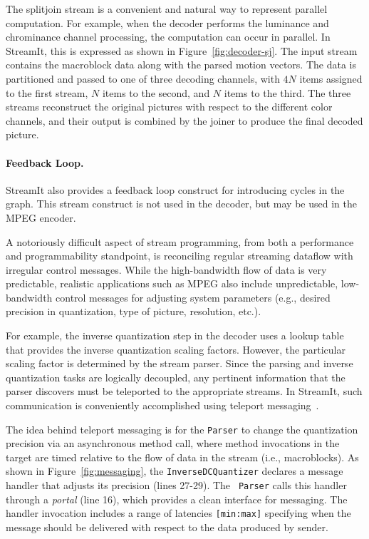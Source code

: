 The splitjoin stream is a convenient and natural way to represent
parallel computation. For example, when the decoder performs the
luminance and chrominance channel processing, the computation can
occur in parallel. In StreamIt, this is expressed as shown in
Figure~\ref{fig:decoder-sj}. The input stream contains the
macroblock data along with the parsed motion vectors. The data is
partitioned and passed to one of three decoding channels, with $4N$
items assigned to the first stream, $N$ items to the second, and $N$
items to the third. The three streams reconstruct the original
pictures with respect to the different color channels, and their
output is combined by the joiner to produce the final decoded picture.

\paragraph{Feedback Loop.}
StreamIt also provides a feedback loop construct for introducing
cycles in the graph. This stream construct is not used in the decoder,
but may be used in the MPEG encoder.

\label{sec:messaging}
A notoriously difficult aspect of stream programming, from both a
performance and programmability standpoint, is reconciling regular
streaming dataflow with irregular control messages.  While the
high-bandwidth flow of data is very predictable, realistic
applications such as MPEG also include unpredictable, low-bandwidth
control messages for adjusting system parameters (e.g., desired
precision in quantization, type of picture, resolution, etc.).

For example, the inverse quantization step in the decoder uses a
lookup table that provides the inverse quantization scaling factors.
However, the particular scaling factor is determined by the stream
parser. Since the parsing and inverse quantization tasks are logically
decoupled, any pertinent information that the parser discovers must be
teleported to the appropriate streams.  In StreamIt, such
communication is conveniently accomplished using teleport
messaging~\cite{thies05ppopp}.

The idea behind teleport messaging is for the {\tt Parser} to change
the quantization precision via an asynchronous method call, where
method invocations in the target are timed relative to the flow of
data in the stream (i.e., macroblocks). As shown in
Figure~\ref{fig:messaging}, the {\tt InverseDCQuantizer} declares a
message handler that adjusts its precision (lines 27-29). The {\tt
Parser} calls this handler through a {\it portal} (line 16), which
provides a clean interface for messaging.  The handler invocation
includes a range of latencies {\tt [min:max]} specifying when the
message should be delivered with respect to the data produced by
sender.

